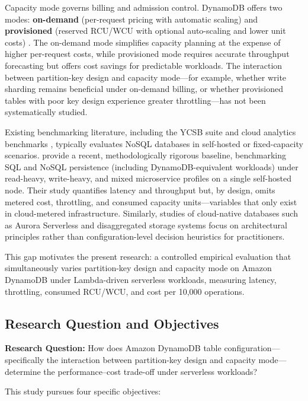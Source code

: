 Capacity mode governs billing and admission control. DynamoDB offers two modes: \textbf{on-demand} (per-request pricing with automatic scaling) and \textbf{provisioned} (reserved RCU/WCU with optional auto-scaling and lower unit costs) \citep{aws2025capacitymode}. The on-demand mode simplifies capacity planning at the expense of higher per-request costs, while provisioned mode requires accurate throughput forecasting but offers cost savings for predictable workloads. The interaction between partition-key design and capacity mode—for example, whether write sharding remains beneficial under on-demand billing, or whether provisioned tables with poor key design experience greater throttling—has not been systematically studied.

Existing benchmarking literature, including the YCSB suite and cloud analytics benchmarks \citep{ferreira2025ycsb, vanrenen2023cloud}, typically evaluates NoSQL databases in self-hosted or fixed-capacity scenarios. \citet{pantelic2026benchmarking} provide a recent, methodologically rigorous baseline, benchmarking SQL and NoSQL persistence (including DynamoDB-equivalent workloads) under read-heavy, write-heavy, and mixed microservice profiles on a single self-hosted node. Their study quantifies latency and throughput but, by design, omits metered cost, throttling, and consumed capacity units—variables that only exist in cloud-metered infrastructure. Similarly, studies of cloud-native databases such as Aurora Serverless \citep{barnhart2024aurora} and disaggregated storage systems \citep{pang2024disaggregated, durner2023object} focus on architectural principles rather than configuration-level decision heuristics for practitioners.

This gap motivates the present research: a controlled empirical evaluation that simultaneously varies partition-key design and capacity mode on Amazon DynamoDB under Lambda-driven serverless workloads, measuring latency, throttling, consumed RCU/WCU, and cost per 10,000 operations.

\subsection{Research Question and Objectives}

\textbf{Research Question:} How does Amazon DynamoDB table configuration—specifically the interaction between partition-key design and capacity mode—determine the performance–cost trade-off under serverless workloads?

This study pursues four specific objectives:

